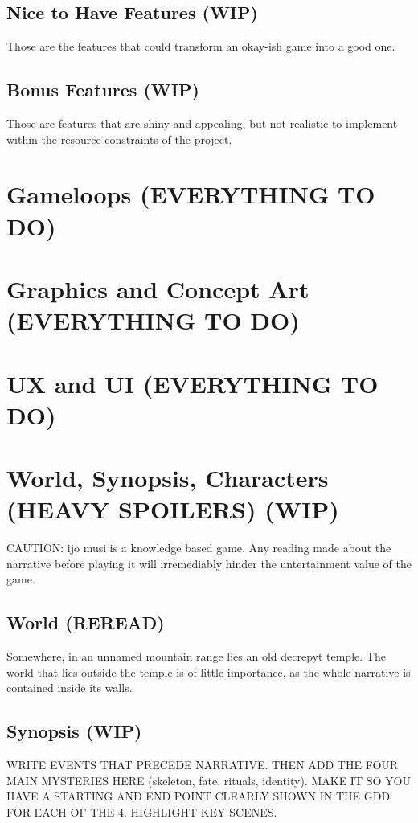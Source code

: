 \documentclass{scrartcl}
\begin{document}
		\subsection{Nice to Have Features (WIP)}
			Those are the features that could transform an okay-ish game into a good one.
		\subsection{Bonus Features (WIP)}
			Those are features that are shiny and appealing, but not realistic to implement within the resource constraints of the project.
	\section{Gameloops (EVERYTHING TO DO)}
	\section{Graphics and Concept Art (EVERYTHING TO DO)}
	\section{UX and UI (EVERYTHING TO DO)}
	\section{World, Synopsis, Characters (HEAVY SPOILERS) (WIP)}
		CAUTION: ijo musi is a knowledge based game. Any reading made about the narrative before playing it will irremediably hinder the untertainment value of the game.
		\subsection{World (REREAD)}
			Somewhere, in an unnamed mountain range lies an old decrepyt temple. The world that lies outside the temple is of little importance, as the whole narrative is contained inside its walls.
		\subsection{Synopsis (WIP)}
		WRITE EVENTS THAT PRECEDE NARRATIVE.
		THEN ADD THE FOUR MAIN MYSTERIES HERE (skeleton, fate, rituals, identity). MAKE IT SO YOU HAVE A STARTING AND END POINT CLEARLY SHOWN IN THE GDD FOR EACH OF THE 4. HIGHLIGHT KEY SCENES.
\end{document}
